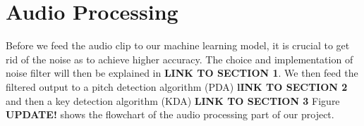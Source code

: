 \chapter{Audio Processing} %

\label{Chapter5} %
Before we feed the audio clip to our machine learning model, it is crucial to get rid of the noise as to achieve higher accuracy.
The choice and implementation of noise filter will then be explained in \textbf{LINK TO SECTION 1}. We then feed the filtered output 
to a pitch detection algorithm (PDA) \textbf{lINK TO SECTION 2} and then a key detection algorithm (KDA) \textbf{LINK TO SECTION 3}
Figure \textbf{UPDATE!} shows the flowchart of the audio processing part of our project.




